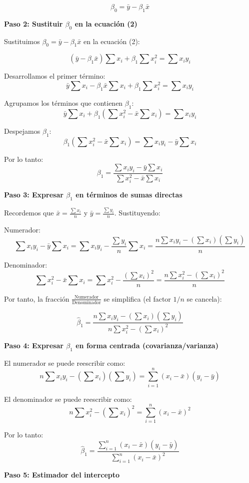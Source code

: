 \documentclass[12pt, a4paper]{article}
\begin{document}
\[
\boxed{\beta_0 = \bar{y} - \beta_1 \bar{x}}
\]

\textbf{Paso 2: Sustituir $\beta_0$ en la ecuación (2)}

Sustituimos $\beta_0 = \bar{y} - \beta_1 \bar{x}$ en la ecuación (2):

\[
(\bar{y} - \beta_1 \bar{x}) \sum x_i + \beta_1 \sum x_i^2 = \sum x_i y_i
\]

Desarrollamos el primer término:
\[
\bar{y} \sum x_i - \beta_1 \bar{x} \sum x_i + \beta_1 \sum x_i^2 = \sum x_i y_i
\]

Agrupamos los términos que contienen $\beta_1$:
\[
\bar{y} \sum x_i + \beta_1 \left( \sum x_i^2 - \bar{x} \sum x_i \right) = \sum x_i y_i
\]

Despejamos $\beta_1$:
\[
\beta_1 \left( \sum x_i^2 - \bar{x} \sum x_i \right) = \sum x_i y_i - \bar{y} \sum x_i
\]

Por lo tanto:
\[
\boxed{\beta_1 = \frac{\sum x_i y_i - \bar{y} \sum x_i}{\sum x_i^2 - \bar{x} \sum x_i}}
\]

\textbf{Paso 3: Expresar $\beta_1$ en términos de sumas directas}

Recordemos que $\bar{x} = \frac{\sum x_i}{n}$ y $\bar{y} = \frac{\sum y_i}{n}$. Sustituyendo:

Numerador:
\[
\sum x_i y_i - \bar{y} \sum x_i = \sum x_i y_i - \frac{\sum y_i}{n} \sum x_i = \frac{n\sum x_i y_i - (\sum x_i)(\sum y_i)}{n}
\]

Denominador:
\[
\sum x_i^2 - \bar{x} \sum x_i = \sum x_i^2 - \frac{(\sum x_i)^2}{n} = \frac{n\sum x_i^2 - (\sum x_i)^2}{n}
\]

Por tanto, la fracción $\frac{\text{Numerador}}{\text{Denominador}}$ se simplifica (el factor $1/n$ se cancela):

\[
\boxed{\hat{\beta}_1 = \frac{n\sum x_i y_i - (\sum x_i)(\sum y_i)}{n\sum x_i^2 - (\sum x_i)^2}}
\]

\textbf{Paso 4: Expresar $\beta_1$ en forma centrada (covarianza/varianza)}

El numerador se puede reescribir como:
\[
n\sum x_i y_i - (\sum x_i)(\sum y_i) = \sum_{i=1}^n (x_i - \bar{x})(y_i - \bar{y})
\]

El denominador se puede reescribir como:
\[
n\sum x_i^2 - (\sum x_i)^2 = \sum_{i=1}^n (x_i - \bar{x})^2
\]

Por lo tanto:
\[
\boxed{\hat{\beta}_1 = \frac{\sum_{i=1}^n (x_i - \bar{x})(y_i - \bar{y})}{\sum_{i=1}^n (x_i - \bar{x})^2}}
\]

\textbf{Paso 5: Estimador del intercepto}
\end{document}
